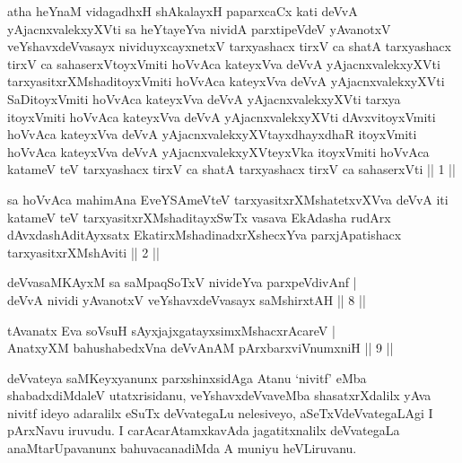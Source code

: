 
\begin{kandikeshl}
atha heYnaM vidagadhxH shAkalayxH paparxcaCx kati deVvA yAjacnxvalekxyXVti sa heYtayeYva nividA parxtipeVdeV yAvanotxV veYshavxdeVvasayx nividuyxcayxnetxV tarxyashacx tirxV ca shatA tarxyashacx tirxV ca sahaserxVtoyxVmiti hoVvAca kateyxVva deVvA yAjacnxvalekxyXVti tarxyasitxrXMshaditoyxVmiti hoVvAca kateyxVva deVvA yAjacnxvalekxyXVti SaDitoyxVmiti hoVvAca kateyxVva deVvA yAjacnxvalekxyXVti tarxya itoyxVmiti hoVvAca kateyxVva deVvA yAjacnxvalekxyXVti dAvxvitoyxVmiti hoVvAca kateyxVva deVvA yAjacnxvalekxyXVtayxdhayxdhaR itoyxVmiti hoVvAca kateyxVva deVvA yAjacnxvalekxyXVteyxVka itoyxVmiti hoVvAca katameV teV tarxyashacx tirxV ca shatA tarxyashacx tirxV ca sahaserxVti || 1 ||
\end{kandikeshl}

\begin{kandikeshl}
sa hoVvAca mahimAna EveYSAmeVteV tarxyasitxrXMshatetxvXVva deVvA iti katameV teV tarxyasitxrXMshaditayxSwTx vasava EkAdasha rudArx dAvxdashAditAyxsatx EkatirxMshadinadxrXshecxYva parxjApatishacx tarxyasitxrXMshAviti || 2 ||
\end{kandikeshl}

\begin{shl}
deVvasaMKAyxM sa saMpaqSoTxV \footnotemark[3]{}nivideYva parxpeVdivAnf |\\
deVvA nividi yAvanotxV veYshavxdeVvasayx saMshirxtAH \hfill || 8 ||
\end{shl}

\begin{shl}
tAvanatx Eva soV\s suH sAyxjajxgatayxsimxMshacxrAcareV |\\
AnatxyXM bahushabedxVna deVvAnAM pArxbarxviVnumxniH \hfill || 9 ||
\end{shl}

\begin{artha}
deVvateya saMKeyxyanunx parxshinxsidAga Atanu `nivitf' eMba shabadxdiMdaleV utatxrisidanu, veYshavxdeVvaveMba shasatxrXdalilx yAva nivitf ideyo adaralilx eSuTx deVvategaLu nelesiveyo, aSeTxVdeVvategaLAgi I pArxNavu iruvudu. I carAcarAtamxkavAda jagatitxnalilx deVvategaLa anaMtarUpavanunx bahuvacanadiMda A muniyu heVLiruvanu.
\end{artha}%

